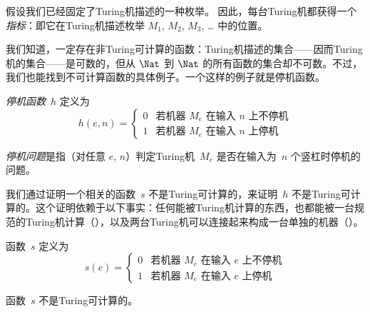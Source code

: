 \documentclass[../../../include/open-logic-section]{subfiles}
\begin{document}

\begin{explain}
假设我们已经固定了Turing机描述的一种枚举。
因此，每台Turing机都获得一个\emph{指标}：即它在Turing机描述枚举 $M_1$, $M_2$, $M_3$, \dots{} 中的位置。

我们知道，一定存在非Turing可计算的函数：Turing机描述的集合——因而Turing机的集合——是可数的，但从 $\Nat$ 到 $\Nat$ 的所有函数的集合却不可数。不过，我们也能找到不可计算函数的具体例子。一个这样的例子就是停机函数。
\end{explain}

\begin{defn}[停机函数]
 \emph{停机函数}~$h$ 定义为
\[
h(e,n) =
\begin{cases}
  \text{0} & \text{若机器~$M_e$ 在输入 $n$ 上不停机} \\
  \text{1} & \text{若机器~$M_e$ 在输入 $n$ 上停机}
\end{cases}
\]
\end{defn}

\begin{defn}[停机问题]
\emph{停机问题}是指（对任意 $e$, $n$）判定Turing机~$M_e$ 是否在输入为~$n$ 个竖杠时停机的问题。
\end{defn}

\begin{explain}
我们通过证明一个相关的函数~$s$ 不是Turing可计算的，来证明~$h$ 不是Turing可计算的。这个证明依赖于以下事实：任何能被Turing机计算的东西，也都能被一台规范的Turing机计算（），以及两台Turing机可以连接起来构成一台单独的机器（）。
\end{explain}

\begin{defn} 函数~$s$ 定义为
\[
s(e) =
\begin{cases}
  \text{0} & \text{若机器~$M_e$ 在输入 $e$ 上不停机} \\
  \text{1} & \text{若机器~$M_e$ 在输入 $e$ 上停机}
\end{cases}
\]
\end{defn}

\begin{lem}
函数~$s$ 不是Turing可计算的。
\end{lem}
\end{document}
